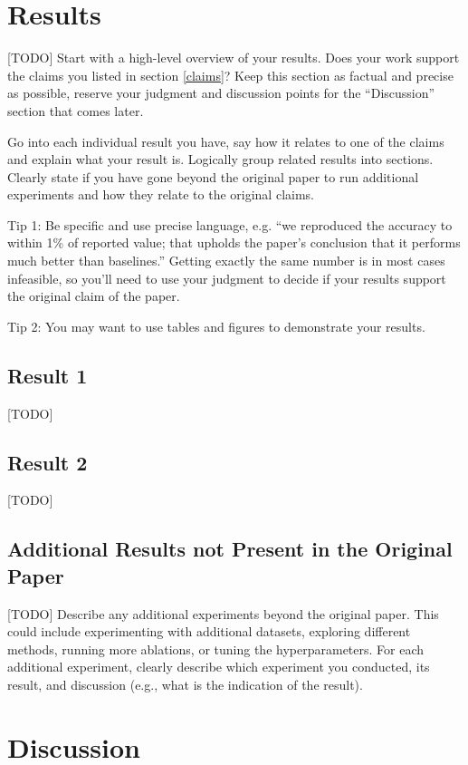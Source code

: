 \documentclass{article}
\begin{document}
\section{Results}

[TODO] Start with a high-level overview of your results. Does your work support the claims you listed in section \ref{claims}? Keep this section as factual and precise as possible, reserve your judgment and discussion points for the ``Discussion'' section that comes later. 

Go into each individual result you have, say how it relates to one of the claims and explain what your result is. Logically group related results into sections. Clearly state if you have gone beyond the original paper to run additional experiments and how they relate to the original claims. 

Tip 1: Be specific and use precise language, e.g. ``we reproduced the accuracy to within 1\% of reported value; that upholds the paper's conclusion that it performs much better than baselines.'' Getting exactly the same number is in most cases infeasible, so you'll need to use your judgment to decide if your results support the original claim of the paper. 

Tip 2: You may want to use tables and figures to demonstrate your results.


\subsection{Result 1}
[TODO]
\subsection{Result 2}
[TODO]
\subsection{Additional Results not Present in the Original Paper}

[TODO] Describe any additional experiments beyond the original paper. This could include experimenting with additional datasets, exploring different methods, running more ablations, or tuning the hyperparameters. For each additional experiment, clearly describe which experiment you conducted, its result, and discussion (e.g., what is the indication of the result).

\section{Discussion}
\end{document}
